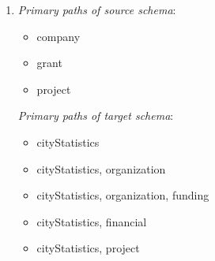 \documentclass{scrartcl}
\begin{document}
	\begin{enumerate}
		\item \textit{Primary paths of source schema}:
		\begin{itemize}
			\item company
			\item grant
			\item project
		\end{itemize}
		
		\textit{Primary paths of target schema}:
		\begin{itemize}
			\item cityStatistics
			\item cityStatistics, organization
			\item cityStatistics, organization, funding
			\item cityStatistics, financial
			\item cityStatistics, project
		\end{itemize}
		

\end{enumerate}
\end{document}
